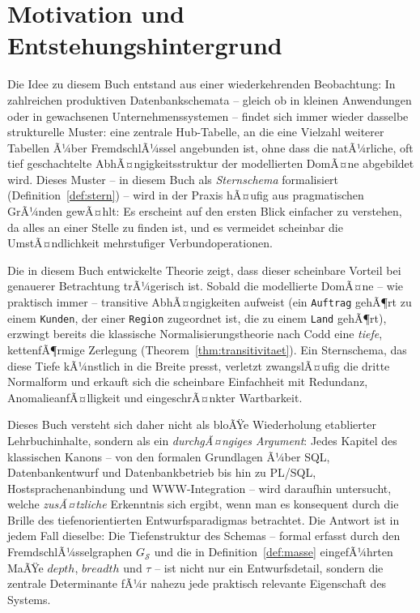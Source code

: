 ﻿\documentclass[a4paper,12pt]{report}
\theoremstyle{definition}
\theoremstyle{remark}
\newcommand{\depth}{\mathit{depth}}
\newcommand{\breadth}{\mathit{breadth}}
\begin{document}
\section*{Motivation und Entstehungshintergrund}

Die Idee zu diesem Buch entstand aus einer wiederkehrenden
Beobachtung: In zahlreichen produktiven Datenbankschemata -- gleich ob
in kleinen Anwendungen oder in gewachsenen Unternehmenssystemen --
findet sich immer wieder dasselbe strukturelle Muster: eine zentrale
\glqq Hub\grqq{}-Tabelle, an die eine Vielzahl weiterer Tabellen Ã¼ber
FremdschlÃ¼ssel angebunden ist, ohne dass die natÃ¼rliche, oft tief
geschachtelte AbhÃ¤ngigkeitsstruktur der modellierten DomÃ¤ne
abgebildet wird. Dieses Muster -- in diesem Buch als
\emph{Sternschema} formalisiert (Definition~\ref{def:stern}) -- wird
in der Praxis hÃ¤ufig aus pragmatischen GrÃ¼nden gewÃ¤hlt: Es erscheint
auf den ersten Blick einfacher zu verstehen, da \glqq alles an einer
Stelle\grqq{} zu finden ist, und es vermeidet scheinbar die
\glqq UmstÃ¤ndlichkeit\grqq{} mehrstufiger Verbundoperationen.

Die in diesem Buch entwickelte Theorie zeigt, dass dieser scheinbare
Vorteil bei genauerer Betrachtung trÃ¼gerisch ist. Sobald die
modellierte DomÃ¤ne -- wie praktisch immer -- transitive
AbhÃ¤ngigkeiten aufweist (ein \texttt{Auftrag} gehÃ¶rt zu einem
\texttt{Kunden}, der einer \texttt{Region} zugeordnet ist, die zu
einem \texttt{Land} gehÃ¶rt), erzwingt bereits die klassische
Normalisierungstheorie nach Codd eine \emph{tiefe}, kettenfÃ¶rmige
Zerlegung (Theorem~\ref{thm:transitivitaet}). Ein Sternschema, das
diese Tiefe kÃ¼nstlich in die Breite presst, verletzt zwangslÃ¤ufig die
dritte Normalform und erkauft sich die scheinbare Einfachheit mit
Redundanz, AnomalieanfÃ¤lligkeit und eingeschrÃ¤nkter Wartbarkeit.

Dieses Buch versteht sich daher nicht als bloÃŸe Wiederholung
etablierter Lehrbuchinhalte, sondern als ein \emph{durchgÃ¤ngiges
Argument}: Jedes Kapitel des klassischen Kanons -- von den formalen
Grundlagen Ã¼ber SQL, Datenbankentwurf und Datenbankbetrieb bis hin zu
PL/SQL, Hostsprachenanbindung und WWW-Integration -- wird daraufhin
untersucht, welche \emph{zusÃ¤tzliche} Erkenntnis sich ergibt, wenn man
es konsequent durch die Brille des tiefenorientierten
Entwurfsparadigmas betrachtet. Die Antwort ist in jedem Fall
dieselbe: Die Tiefenstruktur des Schemas -- formal erfasst durch den
FremdschlÃ¼sselgraphen $G_{\mathcal{S}}$ und die in
Definition~\ref{def:masse} eingefÃ¼hrten MaÃŸe $\depth$, $\breadth$ und
$\tau$ -- ist nicht nur ein Entwurfsdetail, sondern die zentrale
Determinante fÃ¼r nahezu jede praktisch relevante Eigenschaft des
Systems.
\end{document}

